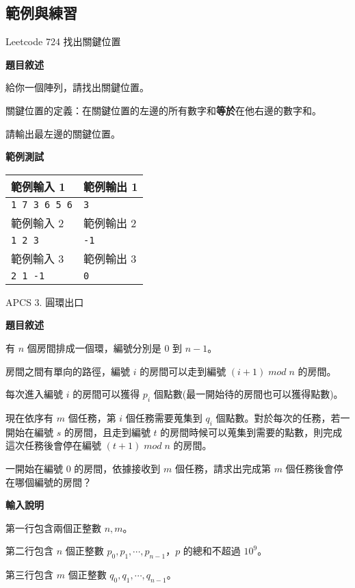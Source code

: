     \subsection{範例與練習}

    \example Leetcode 724 找出關鍵位置

    \textbf{題目敘述}

    給你一個陣列，請找出關鍵位置。

    關鍵位置的定義：在關鍵位置的左邊的所有數字和\textbf{等於}在他右邊的數字和。

    請輸出最左邊的關鍵位置。

    \textbf{範例測試}

    \begin{tabular}{|m{7cm}|m{7cm}|}
        \hline
        範例輸入 1 & 範例輸出 1 \\
        \hline
        \verb|1 7 3 6 5 6| &  \verb|3| \\
        \hline
        範例輸入 2 & 範例輸出 2 \\
        \hline
        \verb|1 2 3| &  \verb|-1| \\
        \hline
        範例輸入 3 & 範例輸出 3 \\
        \hline
        \verb|2 1 -1| &  \verb|0| \\
        \hline
    \end{tabular}

    \problem APCS 3. 圓環出口

    \textbf{題目敘述}

    有 $n$ 個房間排成一個環，編號分別是 $0$ 到 $n-1$。

    房間之間有單向的路徑，編號 $i$ 的房間可以走到編號 $(i+1) \; mod \; n$ 的房間。

    每次進入編號 $i$ 的房間可以獲得 $p_i$ 個點數(最一開始待的房間也可以獲得點數)。

    現在依序有 $m$ 個任務，第 $i$ 個任務需要蒐集到 $q_i$ 個點數。對於每次的任務，若一開始在編號 $s$ 的房間，且走到編號 $t$ 的房間時候可以蒐集到需要的點數，則完成這次任務後會停在編號 $(t+1) \; mod \; n$ 的房間。

    一開始在編號 $0$ 的房間，依據接收到 $m$ 個任務，請求出完成第 $m$ 個任務後會停在哪個編號的房間？

    \textbf{輸入說明}

    第一行包含兩個正整數 $n,m$。

    第二行包含 $n$ 個正整數 $p_0,p_1,\cdots,p_{n-1}$，$p$ 的總和不超過 $10^9$。

    第三行包含 $m$ 個正整數 $q_0,q_1,\cdots,q_{n-1}$。

